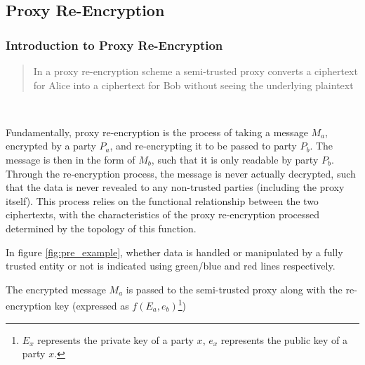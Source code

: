 \subsection{Proxy Re-Encryption}

\subsubsection{Introduction to Proxy Re-Encryption}

\blockquote{In a proxy re-encryption scheme a semi-trusted proxy converts a ciphertext for Alice into a ciphertext for Bob without seeing the underlying plaintext}~\autocite{greenateniese:2006:article}

Fundamentally, proxy re-encryption is the process of taking a message $M_a$, encrypted by a party $P_a$, and re-encrypting it to be passed to party $P_b$. The message is then in the form of $M_b$, such that it is only readable by party $P_b$. Through the re-encryption process, the message is never actually decrypted, such that the data is never revealed to any non-trusted parties (including the proxy itself). This process relies on the functional relationship between the two ciphertexts, with the characteristics of the proxy re-encryption processed determined by the topology of this function.



In figure \ref{fig:pre_example}, whether data is handled or manipulated by a fully trusted entity or not is indicated using green/blue and red lines respectively.

The encrypted message $M_a$ is passed to the semi-trusted proxy along with the re-encryption key (expressed as $f(E_a, e_b)$\footnote{$E_x$ represents the private key of a party $x$, $e_x$ represents the public key of a party $x$.})






